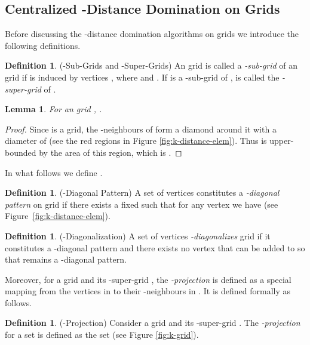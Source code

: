 \documentclass[letterpaper, 10pt, conference]{ieeeconf}
\newtheorem{lemma}[theorem]{Lemma}
\theoremstyle{definition}
\newtheorem{definition}[theorem]{Definition}
\theoremstyle{remark}
\begin{document}
\subsection{Centralized -Distance Domination on Grids}
\label{subsec:upper-bound-k-distance}
Before discussing the -distance domination algorithms on grids we introduce the following definitions.


\begin{definition}(-Sub-Grids and -Super-Grids)
\label{def:k-super}
An  grid  is called a \emph{-sub-grid} of an  grid  if  is induced by vertices , where  and . If  is a -sub-grid of ,  is called the \emph{-super-grid} of .
\end{definition}


\begin{lemma}
\label{lem:k-distance-unit}
For an  grid , .
\end{lemma}

\begin{proof}
Since  is a grid, the -neighbours of  form a diamond around it with a diameter of  (see the red regions in Figure \ref{fig:k-distance-elem}). Thus  is upper-bounded by the area of this region, which is .
\end{proof}

In what follows we define .


\begin{definition}(-Diagonal Pattern)
\label{def:k-diag-patt}
A set of vertices  constitutes a \emph{-diagonal pattern} on grid  if there exists a fixed  such that for any vertex  we have  (see Figure~\ref{fig:k-distance-elem}).
\end{definition}


\begin{definition}(-Diagonalization)
\label{def:k-diagonalization}
A set of vertices  \emph{-diagonalizes} grid  if it constitutes a -diagonal pattern and there exists no vertex  that can be added to  so that  remains a -diagonal pattern.
\end{definition}

Moreover, for a grid  and its -super-grid , the \emph{-projection} is defined as a special mapping from the vertices in  to their -neighbours in . It is defined formally as follows.


\begin{definition}(-Projection)
\label{def:k-porjection}
Consider a grid  and its -super-grid . The \emph{-projection} for a set  is defined as
the set  (see Figure \ref{fig:k-grid}).
\end{definition}
\end{document}
